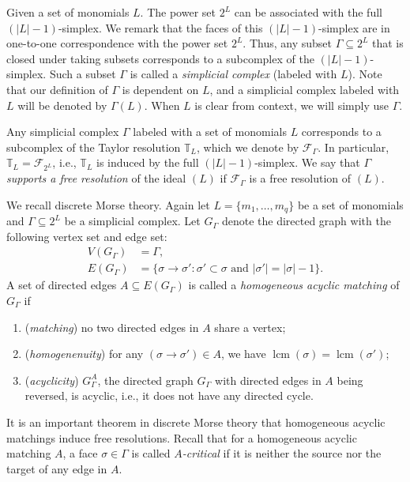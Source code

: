 \documentclass[reqno]{amsart}
\DeclareMathOperator{\lcm}{lcm}
\newcommand{\TT}{\mathbb{T}}
\theoremstyle{definition}
\theoremstyle{remark}
\numberwithin{equation}{section}
\begin{document}
Given a set of monomials $L$. The power set $2^L$ can be associated with the full $(|L|-1)$-simplex. We remark that the faces of this $(|L|-1)$-simplex are in one-to-one correspondence with the power set $2^L$. Thus, any subset $\Gamma \subseteq 2^{L}$ that is closed under taking subsets corresponds to a subcomplex of the $(|L|-1)$-simplex. Such a subset $\Gamma$ is called a \emph{simplicial complex} (labeled with $L$). Note that our definition of $\Gamma$ is dependent on $L$, and a simplicial complex labeled with $L$ will be denoted by $\Gamma(L)$. When $L$ is clear from context, we will simply use $\Gamma$.

Any simplicial complex $\Gamma$ labeled with a set of monomials $L$ corresponds to a subcomplex of the Taylor resolution $\mathbb{T}_L$, which we denote by $\mathcal{F}_\Gamma$. In particular, $\TT_L=\mathcal{F}_{2^L}$, i.e., $\TT_L$ is induced by the full $(|L|-1)$-simplex. We say that $\Gamma$ \emph{supports a free resolution} of the ideal $(L)$ if $\mathcal{F}_\Gamma$ is a free resolution of $(L)$.



We recall discrete Morse theory. Again let  $L=\{m_1,\dots, m_q\}$ be a set of monomials and $\Gamma \subseteq 2^{L}$ be a simplicial complex. Let $G_{\Gamma}$ denote the directed graph with the following vertex set and edge set:
\begin{align*}
    V(G_{\Gamma})&= \Gamma,\\
    E(G_{\Gamma})&= \{\sigma\to \sigma'\colon \sigma'\subset \sigma \text{ and } |\sigma'|=|\sigma|-1\}.
\end{align*}
A set of directed edges $A\subseteq E(G_\Gamma)$ is called a \emph{homogeneous acyclic matching} of $G_\Gamma$ if
\begin{enumerate}
    \item (\emph{matching}) no two directed edges in $A$ share a vertex;
    \item (\emph{homogenenuity}) for any $(\sigma\to \sigma')\in A$, we have $\lcm(\sigma)=\lcm(\sigma')$;
    \item (\emph{acyclicity}) $G_\Gamma^A$, the directed graph $G_\Gamma$ with directed edges in $A$ being reversed, is acyclic, i.e., it does not have any directed cycle.
\end{enumerate}

It is an important theorem in discrete Morse theory that homogeneous acyclic matchings induce free resolutions. Recall that for a homogeneous acyclic matching $A$, a face $\sigma\in \Gamma$ is called \emph{$A$-critical} if it is neither the source nor the target of any edge in $A$.
\end{document}
